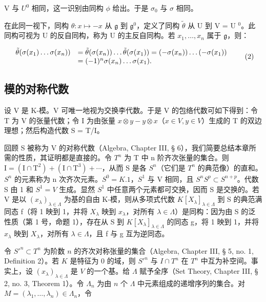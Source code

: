 V 与 \(U^{0}\) 相同，这一识别由同构 \(\phi\) 给出。于是 \(\sigma_{0}\) 与 \(\sigma\) 相同。

在此同一视下，同构 \(\theta: x \mapsto -x\) 从 \(\mathfrak{g}\) 到 \(\mathfrak{g}^0\)，定义了同构 \(\tilde{\theta}\) 从 U 到 V = U \(^0\)。此同构可视为 U 的反自同构，称为 U 的主反自同构。若 \(x_{1}, \ldots, x_{n}\) 属于 \(\mathfrak{g}\)，则：

\[
\begin{array}{r l} \tilde {\theta} (\sigma (x _ {1}) \dots \sigma (x _ {n})) & = \tilde {\theta} (\sigma (x _ {n})) \dots \tilde {\theta} (\sigma (x _ {1})) = (- \sigma (x _ {n})) \dots (- \sigma (x _ {1})) \\ & = (- 1) ^ {n} \sigma (x _ {n}) \dots \sigma (x _ {1}). \end{array}\tag{2}
\]

\subsection{模的对称代数}

设 V 是 K-模。V 可唯一地视为交换李代数。于是 V 的包络代数可如下得到：令 T 为 V 的张量代数；令 I 为由张量 \(x \otimes y - y \otimes x\)（\(x \in V, y \in V\)）生成的 T 的双边理想；然后构造代数 S = T/I。

回顾 S 被称为 V 的对称代数（Algebra, Chapter III, § 6），我们简要总结本章所需的性质，其证明都是直接的。令 \(T^{n}\) 为 T 中 n 阶齐次张量的集合。则 \(\mathrm{I} = (\mathrm{I} \cap \mathrm{T}^{2}) + (\mathrm{I} \cap \mathrm{T}^{3}) + \cdots\)，从而 S 是各 \(S^{n}\)（它们是 \(T^{n}\) 的典范像）的直和。\(S^{n}\) 的元素称为 n 次齐次元素。\(S^{0} = K.1\)，\(S^{1}\) 与 V 相同，且 \(S^{n}S^{p} \subset S^{n+p}\)。代数 S 由 1 和 \(S^{1} = V\) 生成。显然 \(S^{1}\) 中任意两个元素都可交换，因而 S 是交换的。若 V 是以 \((x_{\lambda})_{\lambda \in \Lambda}\) 为基的自由 K-模，则从多项式代数 \(K[X_{\lambda}]_{\lambda \in \Lambda}\) 到 S 的典范满同态 f（将 1 映到 1，并将 \(X_{\lambda}\) 映到 \(x_{\lambda}\)，对所有 \(\lambda \in \Lambda\)）是同构：因为由 S 的泛性质（第 1 号，命题 1），存在从 S 到 \(K[X_{\lambda}]_{\lambda \in \Lambda}\) 的同态 g，将 1 映到 1，并将 \(x_{\lambda}\) 映到 \(X_{\lambda}\)，对所有 \(\lambda \in \Lambda\)，且 f 与 g 互为逆同态。

令 \(S'^{n} \subset T^n\) 为阶数 \(n\) 的齐次对称张量的集合（Algebra, Chapter III, § 5, no. 1, Definition 2）。若 \(K\) 是特征为 0 的域，则 \(S'^{n}\) 与 \(I \cap T^n\) 在 \(T^n\) 中互为补空间。事实上，设 \((x_{\lambda})_{\lambda \in \Lambda}\) 是 \(V\) 的一个基。给 \(\Lambda\) 赋予全序（Set Theory, Chapter III, § 2, no. 3, Theorem 1）。令 \(\Lambda_n\) 为由 \(n\) 个 \(\Lambda\) 中元素组成的递增序列的集合。对 \(M = (\lambda_1, \ldots, \lambda_n) \in \Lambda_n\)，令

